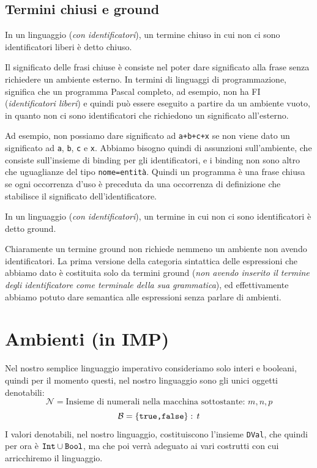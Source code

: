 \documentclass[oneside,a4paper,11pt]{book}
\theoremstyle{italicstyle}
\theoremstyle{normStyle}
\begin{document}
\subsection{Termini chiusi e ground}
\begin{tcolorbox}[title = {Termine chiuso}]
  In un linguaggio (\textit{con identificatori}), un termine chiuso in cui non 
  ci sono identificatori liberi è detto chiuso.
\end{tcolorbox}
Il significato delle frasi chiuse è consiste nel poter dare significato alla
frase senza richiedere un ambiente esterno. In termini
di linguaggi di programmazione, significa che un programma
Pascal completo, ad esempio, non ha FI (\textit{identificatori liberi}) e
quindi può essere eseguito a partire da un ambiente vuoto, in
quanto non ci sono identificatori che richiedono un
significato all’esterno.

Ad esempio, non possiamo dare significato ad \verb|a+b+c+x| se
non viene dato un significato ad \verb|a|, \verb|b|, \verb|c| e \verb|x|.
Abbiamo bisogno
quindi di assunzioni sull'ambiente, che consiste sull'insieme
di binding per gli identificatori, e i binding non sono
altro che uguaglianze del tipo \verb|nome=entità|. Quindi un
programma è una frase chiusa se ogni occorrenza d’uso è
preceduta da una occorrenza di definizione che stabilisce
il significato dell’identificatore.
\begin{tcolorbox}[title = {Termine gound}]
  In un linguaggio (\textit{con identificatori}), un termine in cui non ci sono 
  identificatori è detto ground.
\end{tcolorbox}
Chiaramente un termine ground non richiede nemmeno
un ambiente non avendo identificatori. La prima versione
della categoria sintattica delle espressioni che abbiamo
dato è costituita solo da termini ground (\textit{non avendo inserito il termine
degli identificatore come terminale della sua grammatica}), ed
effettivamente abbiamo potuto dare
semantica alle espressioni senza parlare di ambienti.
\section{Ambienti (in IMP)}
Nel nostro semplice linguaggio imperativo consideriamo solo interi 
e booleani, quindi per il momento questi, nel nostro linguaggio sono 
gli unici oggetti denotabili:
\[
  \mathcal{N} = \text{Insieme di numerali nella macchina sottostante: }m,n,p
\]
\[
  \mathcal{B} = \{\verb|true,false|\}:\,t
\]
I valori denotabili, nel nostro linguaggio, costituiscono l'insieme 
\verb|DVal|, che quindi per ora è $\verb|Int| \cup \verb|Bool|$, ma che poi verrà 
adeguato ai vari costrutti con cui arricchiremo il linguaggio.
\end{document}
